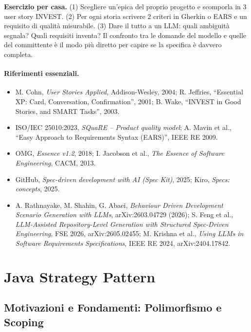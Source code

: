 \documentclass[12pt]{extarticle}
\begin{document}
\noindent \textbf{Esercizio per casa.} (1) Scegliere un'epica del proprio progetto e scomporla in 3 user story INVEST. (2) Per ogni storia scrivere 2 criteri in Gherkin o EARS e un requisito di qualità misurabile. (3) Dare il tutto a un LLM: quali ambiguità segnala? Quali requisiti inventa? Il confronto tra le domande del modello e quelle del committente è il modo più diretto per capire se la specifica è davvero completa.

\paragraph{Riferimenti essenziali.}
\begin{itemize}
    \item M. Cohn, \textit{User Stories Applied}, Addison-Wesley, 2004; R. Jeffries, ``Essential XP: Card, Conversation, Confirmation'', 2001; B. Wake, ``INVEST in Good Stories, and SMART Tasks'', 2003.
    \item ISO/IEC 25010:2023, \textit{SQuaRE -- Product quality model}; A. Mavin et al., ``Easy Approach to Requirements Syntax (EARS)'', IEEE RE 2009.
    \item OMG, \textit{Essence v1.2}, 2018; I. Jacobson et al., \textit{The Essence of Software Engineering}, CACM, 2013.
    \item GitHub, \textit{Spec-driven development with AI (Spec Kit)}, 2025; Kiro, \textit{Specs: concepts}, 2025.
    \item A. Rathnayake, M. Shahin, G. Abaei, \textit{Behaviour Driven Development Scenario Generation with LLMs}, arXiv:2603.04729 (2026); S. Feng et al., \textit{LLM-Assisted Repository-Level Generation with Structured Spec-Driven Engineering}, FSE 2026, arXiv:2605.02455; M. Krishna et al., \textit{Using LLMs in Software Requirements Specifications}, IEEE RE 2024, arXiv:2404.17842.
\end{itemize}

\newpage


\section{Java Strategy Pattern}

\subsection{Motivazioni e Fondamenti: Polimorfismo e Scoping}
\end{document}

